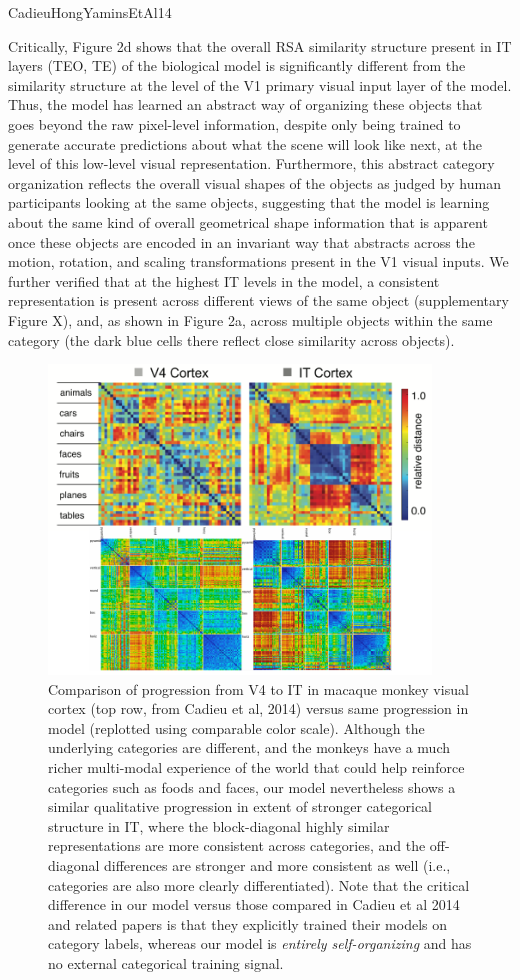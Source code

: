 \documentclass[11pt,twoside]{article}
\newif\myifpdf
\begin{document}
CadieuHongYaminsEtAl14

Critically, Figure 2d shows that the overall RSA similarity structure present in IT layers (TEO, TE) of the biological model is significantly different from the similarity structure at the level of the V1 primary visual input layer of the model.  Thus, the model has learned an abstract way of organizing these objects that goes beyond the raw pixel-level information, despite only being trained to generate accurate predictions about what the scene will look like next, at the level of this low-level visual representation.  Furthermore, this abstract category organization reflects the overall visual shapes of the objects as judged by human participants looking at the same objects, suggesting that the model is learning about the same kind of overall geometrical shape information that is apparent once these objects are encoded in an invariant way that abstracts across the motion, rotation, and scaling transformations present in the V1 visual inputs.  We further verified that at the highest IT levels in the model, a consistent representation is present across different views of the same object (supplementary Figure X), and, as shown in Figure 2a, across multiple objects within the same category (the dark blue cells there reflect close similarity across objects).


\begin{figure}
  \centering\includegraphics[width=4in]{fig_rsa_leabra_macaque}
  \caption{\small Comparison of progression from V4 to IT in macaque monkey visual cortex (top row, from Cadieu et al, 2014) versus same progression in model (replotted using comparable color scale).  Although the underlying categories are different, and the monkeys have a much richer multi-modal experience of the world that could help reinforce categories such as foods and faces, our model nevertheless shows a similar qualitative progression in extent of stronger categorical structure in IT, where the block-diagonal highly similar representations are more consistent across categories, and the off-diagonal differences are stronger and more consistent as well (i.e., categories are also more clearly differentiated).  Note that the critical difference in our model versus those compared in Cadieu et al 2014 and related papers is that they explicitly trained their models on category labels, whereas our model is {\em entirely self-organizing} and has no external categorical training signal.}
  \label{fig.macaque}
\end{figure}
\end{document}
